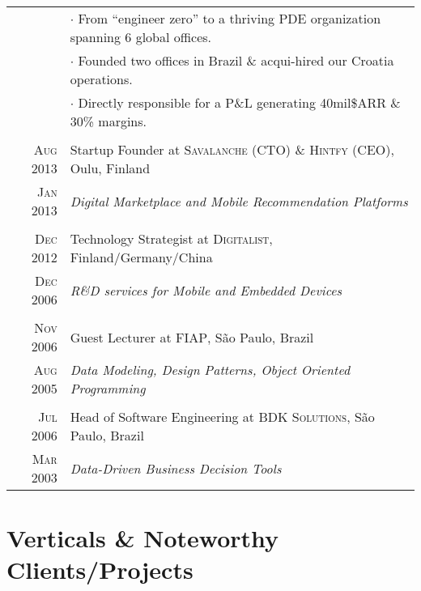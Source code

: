 \documentclass[a4paper,10pt]{article}
\begin{document}
\begin{tabular}{r|p{13cm}}
  &$\cdot$ \footnotesize{From ``engineer zero'' to a thriving PDE organization spanning 6 global offices.}\\
  &$\cdot$ \footnotesize{Founded two offices in Brazil \& acqui-hired our Croatia operations.}\\
  &$\cdot$ \footnotesize{Directly responsible for a P\&L generating 40mil\$\/ARR \& 30\% margins.}\\

  \multicolumn{2}{c}{}\\

  \textsc{Aug 2013} & Startup Founder at \textsc{Savalanche} (CTO) \&
  \textsc{Hintfy} (CEO), Oulu, Finland \\

  \textsc{Jan 2013} & \emph{Digital Marketplace and Mobile Recommendation Platforms} \\

  \multicolumn{2}{c}{}\\

  \textsc{Dec 2012} & Technology Strategist at \textsc{Digitalist},
  Finland/Germany/China \\

  \textsc{Dec 2006} & \emph{R\&D services for Mobile and Embedded Devices} \\

  \multicolumn{2}{c}{}\\

  \textsc{Nov 2006} & Guest Lecturer at \textsc{FIAP}, S\~{a}o Paulo, Brazil \\

  \textsc{Aug 2005} & \emph{Data Modeling, Design Patterns, Object Oriented
  Programming} \\

  \multicolumn{2}{c}{}\\

  \textsc{Jul 2006} & Head of Software Engineering at \textsc{BDK
    Solutions}, S\~{a}o Paulo, Brazil \\

  \textsc{Mar 2003} & \emph{Data-Driven Business Decision Tools} \\

\end{tabular}

\section{Verticals \& Noteworthy Clients/Projects}
\end{document}
